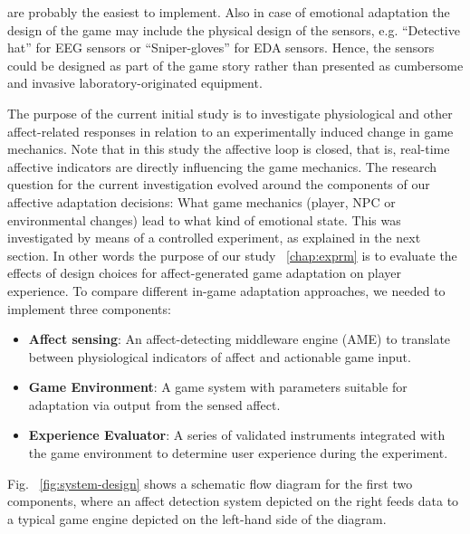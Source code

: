 are probably the easiest to implement. Also in case of emotional adaptation the design of the game may include the physical design of the sensors, e.g. “Detective hat” for EEG sensors or “Sniper-gloves” for EDA sensors. Hence, the sensors could be designed as part of the game story rather than presented as cumbersome and invasive laboratory-originated equipment.

The purpose of the current initial study is to investigate physiological and other affect-related responses in relation to an experimentally induced change in game mechanics. Note that in this study the affective loop is closed, that is, real-time affective indicators are directly influencing the game mechanics. The research question for the current investigation evolved around the components of our affective adaptation decisions: What game mechanics (player, NPC or environmental changes) lead to what kind of emotional state. This was investigated by means of a controlled experiment, as explained in the next section. In other words the purpose of our study ~\ref{chap:exprm} is to evaluate the effects of design choices for affect-generated game adaptation on player experience. To compare different in-game adaptation approaches, we needed to implement three components:

\begin{itemize}
\item \textbf{Affect sensing}: An affect-detecting middleware engine (AME) to translate between physiological indicators of affect and actionable game input.
\item \textbf{Game Environment}: A game system with parameters suitable for adaptation via output from the sensed affect.
\item \textbf{Experience Evaluator}: A series of validated instruments integrated with the game environment to determine user experience during the experiment.
\end{itemize}

Fig. ~\ref{fig:system-design} shows a schematic flow diagram for the first two components, where an affect detection system depicted on the right feeds data to a typical game engine depicted on the left-hand side of the diagram.

